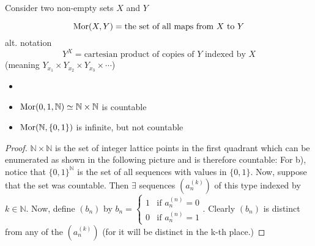 Consider two non-empty sets $X$ and $Y$
\begin{notation}
\[\text{Mor}(X,Y) = \text{the set of all maps from } X \text{ to } Y\]
alt. notation
\[Y^X= \text{cartesian product of copies of }Y\text{ indexed by }X\]
 (meaning $Y_{x_1} \times Y_{x_2} \times Y_{x_3} \times \cdots$)
\end{notation}
\par
\begin{minipage}[b]{0.45\textwidth}
\centering
\begin{lemma}
\begin{itemize}
\item[ ]
\item $\text{Mor}({0,1},\mathbb{N}) \simeq \mathbb{N} \times \mathbb{N}$ is countable
\item $\text{Mor}(\mathbb{N},\{0,1\})$ is infinite, but not countable
\end{itemize}

\begin{proof}
$\mathbb{N} \times \mathbb{N}$ is the set of integer lattice points in the first quadrant which can be enumerated as shown in the following picture and is therefore countable:
For b), notice that $\{0,1\}^\mathbb{N}$ is the set of all sequences with values in $\{0,1\}$. Now, suppose that the set was countable. Then $\exists$ sequences $\left(a_n^{(k)}\right)$  of this type indexed by $k\in\mathbb{N}$.
Now, define $(b_n)$ by $b_n=\begin{cases} 1 &\mbox{if } a_n^{(n)} = 0 \\ 
0 & \mbox{if }  a_n^{(n)} = 1 \end{cases}$. Clearly $(b_n)$ is distinct from any of the $\left(a_n^{(k)}\right)$ (for it will be distinct in the k-th place.)

\end{proof}
\end{lemma}
\end{minipage}
